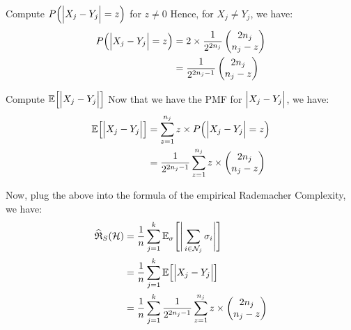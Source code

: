 \begin{solution*}
\begin{subproof}{Compute $P\Big( \Big| X_j - Y_j \Big| = z \Big)$ for $z\ne 0$}
        \noindent Hence, for $X_j\ne Y_j$, we have:
        \begin{align*}
            P\Big( \Big| X_j - Y_j \Big| = z \Big) &= 2 \times \frac{1}{2^{2n_j}}\begin{pmatrix}
                2n_j \\ n_j - z
            \end{pmatrix} \\
            &= \frac{1}{2^{2n_j-1}}\begin{pmatrix}
                2n_j \\ n_j - z
            \end{pmatrix}
        \end{align*}
    \end{subproof}

    \begin{subproof}{Compute $\mathbb{E}\Big[ \Big| X_j - Y_j \Big| \Big]$}
        Now that we have the PMF for $\Big| X_j - Y_j \Big|$, we have:
        \begin{align*}
            \mathbb{E}\Big[ \Big| X_j - Y_j \Big| \Big]
                &= \sum_{z=1}^{n_j} z \times P\Big( \Big| X_j - Y_j \Big| = z \Big) \\
                &= \frac{1}{2^{2n_j - 1}} \sum_{z=1}^{n_j} z \times \begin{pmatrix}
                    2n_j \\ n_j - z
                \end{pmatrix}
        \end{align*}
    \end{subproof}

    \noindent Now, plug the above into the formula of the empirical Rademacher Complexity, we have:
    \begin{align*}
        \widehat{\mathfrak{R}}_S(\mathcal{H})
            &= \frac{1}{n}\sum_{j=1}^k \mathbb{E}_\sigma\Bigg[ \Bigg| 
                \sum_{i\in\mathcal{N}_j}\sigma_i
             \Bigg| \Bigg] \\
            &= \frac{1}{n}\sum_{j=1}^k \mathbb{E}\Big[ \Big| 
                X_j - Y_j
             \Big| \Big] \\
            &= \frac{1}{n}\sum_{j=1}^k \frac{1}{2^{2n_j - 1}} \sum_{z=1}^{n_j} z \times \begin{pmatrix}
                2n_j \\ n_j - z
            \end{pmatrix}
    \end{align*}
\end{solution*}


